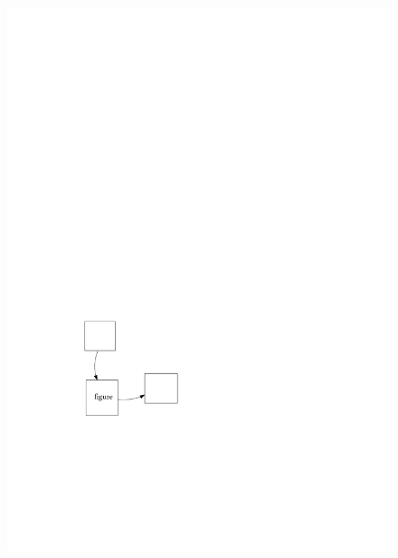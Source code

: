 \documentclass[a4paper,12pt]{memoir}
\begin{document}
\begin{figure}%
  \noindent
  \begin{minipage}{0.5\textwidth}%
    \includegraphics[page=1]{myfigure.pdf}%
  \end{minipage}%
  \begin{minipage}{0.5\textwidth}%

\end{minipage}
\end{figure}
\end{document}
